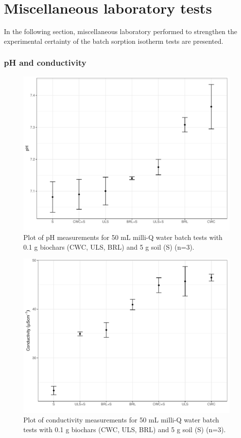 \chapter{Miscellaneous laboratory tests}\label{appSec:misclab}

In the following section, miscellaneous laboratory performed to strengthen the experimental certainty of the batch sorption isotherm tests are presented. 

\subsection{pH and conductivity}

\begin{figure} 
\centering
\includegraphics[width=\textwidth]{R/figs/pH.pdf}
\caption{Plot of pH measurements for 50 mL milli-Q water batch tests with 0.1 g biochars (CWC, ULS, BRL) and 5 g soil (S) (n=3).}
\label{appfig:pH}
\end{figure}

\begin{figure} 
\centering
\includegraphics[width=\textwidth]{R/figs/conductivity.pdf}
\caption{Plot of conductivity measurements for 50 mL milli-Q water batch tests with 0.1 g biochars (CWC, ULS, BRL) and 5 g soil (S) (n=3).}
\label{appfig:cond}
\end{figure}

